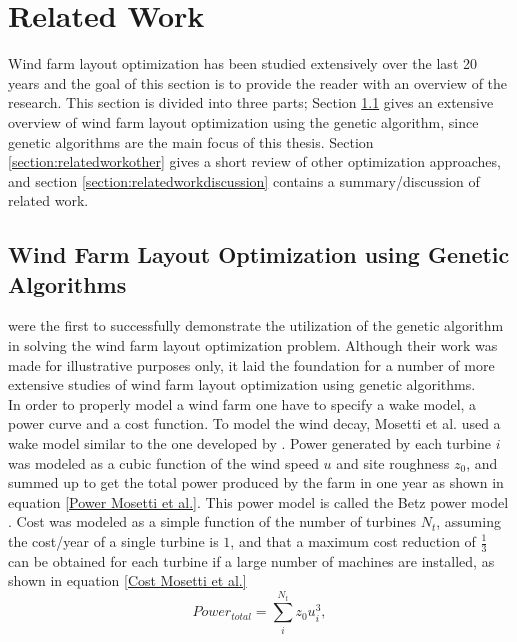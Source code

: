 \chapter{Related Work}\label{chapter:relatedwork}
Wind farm layout optimization has been studied extensively over the last 20 years and the goal of this section is to provide the reader with an overview of the research. This section is divided into three parts; Section \ref{section:relatedworkga} gives an extensive overview of wind farm layout optimization using the genetic algorithm, since genetic algorithms are the main focus of this thesis. Section \ref{section:relatedworkother} gives a short review of other optimization approaches, and section \ref{section:relatedworkdiscussion} contains a summary/discussion of related work.


\section{Wind Farm Layout Optimization using Genetic Algorithms}\label{section:relatedworkga}


\cite{Mosetti} were the first to successfully demonstrate the utilization of the genetic algorithm in solving the wind farm layout optimization problem. Although their work was made for illustrative purposes only, it laid the foundation for a number of more extensive studies of wind farm layout optimization using genetic algorithms.\\

\noindent In order to properly model a wind farm one have to specify a wake model, a power curve and a cost function. To model the wind decay, Mosetti et al. used a wake model similar to the one developed by \cite{Jensen}. Power generated by each turbine $i$ was modeled as a cubic function of the wind speed $u$ and site roughness $z_0$, and summed up to get the total power produced by the farm in one year as shown in equation \ref{Power Mosetti et al.}. This power model is called the Betz power model \citep{Albring}. Cost was modeled as a simple function of the number of turbines $N_t$, assuming the cost/year of a single turbine is $1$, and that a maximum cost reduction of $\frac{1}{3}$ can be obtained for each turbine if a large number of machines are installed, as shown in equation \ref{Cost Mosetti et al.} \\


\begin{equation}
\label{Power Mosetti et al.}
Power_{total} = \sum^{N_t}_{i} z_0u_i^3,
\end{equation}


